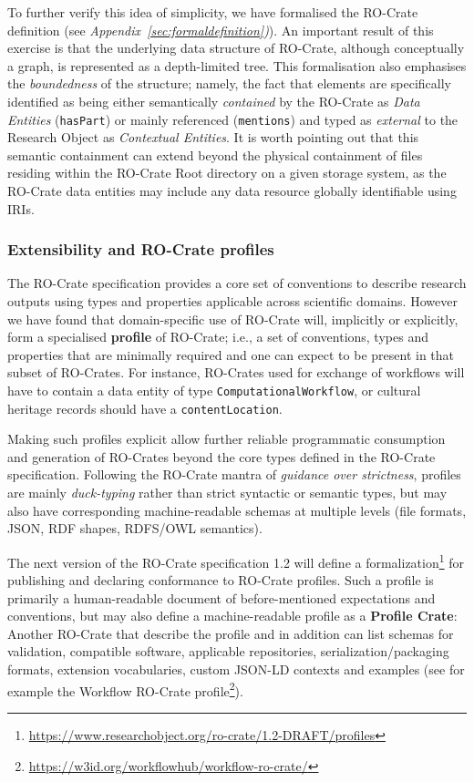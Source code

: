 \documentclass[ds,v1.1.2,openaccess]{iosart2x}%
\begin{document}
To further verify this idea of simplicity, we have formalised the
RO-Crate definition (see \textit{Appendix~\ref{sec:formaldefinition})}). An
important result of this exercise is that the underlying data structure
of RO-Crate, although conceptually a graph, is represented as a
depth-limited tree. This formalisation also emphasises the
\textit{boundedness} of the structure; namely, the fact that elements are
specifically identified as being either semantically \textit{contained} by the
RO-Crate as \textit{Data Entities} (\texttt{hasPart}) or mainly referenced
(\texttt{mentions}) and typed as \textit{external} to the Research Object as
\textit{Contextual Entities}. It is worth pointing out that this semantic
containment can extend beyond the physical containment of files
residing within the RO-Crate Root directory on a given storage system,
as the RO-Crate data entities may include any data resource globally
identifiable using IRIs.
\subsubsection{Extensibility and RO-Crate profiles}%

\label{sec:profiles}

The RO-Crate specification provides a core set of conventions to
describe research outputs using types and properties applicable across
scientific domains. However we have found that domain-specific use of
RO-Crate will, implicitly or explicitly, form a specialised \textbf{profile}
of RO-Crate; i.e., {a set of conventions, types and properties that are
minimally required and one can expect to be present in that subset of
RO-Crates}. For instance, RO-Crates used for exchange of workflows will
have to contain a data entity of type \texttt{ComputationalWorkflow}, or
cultural heritage records should have a \texttt{contentLocation}.

Making such profiles explicit allow further reliable programmatic
consumption and generation of RO-Crates beyond the core types defined
in the RO-Crate specification. Following the RO-Crate mantra of
\textit{guidance over strictness}, profiles are mainly \textit{duck-typing} rather
than strict syntactic or semantic types, but may also have
corresponding machine-readable schemas at multiple levels (file
formats, JSON, RDF shapes, RDFS/OWL semantics).

The next version of the RO-Crate specification 1.2 will define a
formalization\footnote{\url{https://www.researchobject.org/ro-crate/1.2-DRAFT/profiles}}
for publishing and declaring conformance to RO-Crate profiles. Such a
profile is primarily a human-readable document of before-mentioned
expectations and conventions, but may also define a machine-readable
profile as a \textbf{Profile Crate}: Another RO-Crate that describe the
profile and in addition can list schemas for validation, compatible
software, applicable repositories, serialization/packaging formats,
extension vocabularies, custom JSON-LD contexts and examples (see for
example the Workflow RO-Crate
profile\footnote{\url{https://w3id.org/workflowhub/workflow-ro-crate/}}).
\end{document}
